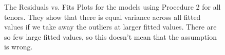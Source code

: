 \begin{figure}[!htbp]
\begin{subfigure}{0.49\textwidth}
        \label{fig:resid vs fit spline model p 2}
    \end{subfigure}
    \caption[The Residuals vs. Fits Plots for the models using Procedure 2 for all tenors.]{The Residuals vs. Fits Plots for the models using Procedure 2 for all tenors. They show that there is equal variance across all fitted values if we take away the outliers at larger fitted values. There are so few large fitted values, so this doesn't mean that the assumption is wrong.}
    \label{fig:resid vs fit p 2}
\end{figure}

\begin{figure}[!htbp]
    \centering
    \captionsetup{type=figure}
    \begin{subfigure}{0.49\textwidth}
        \centering
        \captionsetup{justification=centering}

\end{subfigure}
\end{figure}
